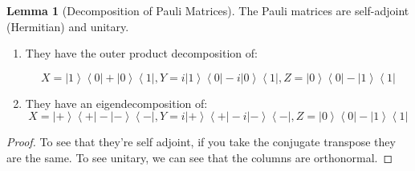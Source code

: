 \documentclass{article}
\newcommand{\ket}[1]{\ensuremath{\left|#1\right\rangle}}
\newcommand{\bra}[1]{\ensuremath{\left\langle#1\right|}}
\theoremstyle{definition}
\newtheorem{lemma}[theorem]{Lemma}
\begin{document}
    \begin{lemma}[Decomposition of Pauli Matrices]
      The Pauli matrices are self-adjoint (Hermitian) and unitary. 
    
      \begin{enumerate}
        \item They have the outer product decomposition of: 

          \[X = \ket{1} \bra{0} + \ket{0} \bra{1}, Y = i \ket{1} \bra{0} - i \ket{0} \bra{1}, Z = \ket{0} \bra{0} - \ket{1} \bra{1}\]

        \item They have an eigendecomposition of: 
          \begin{equation} 
            X = \ket{+} \bra{+} - \ket{-} \bra{-}, Y = i \ket{+} \bra{+} - i \ket{-} \bra{-}, Z = \ket{0} \bra{0} - \ket{1} \bra{1}   
          \end{equation}
      \end{enumerate}

    \end{lemma}
    \begin{proof}
      To see that they're self adjoint, if you take the conjugate transpose they are the same. To see unitary, we can see that the columns are orthonormal. 
    \end{proof}
\end{document}
